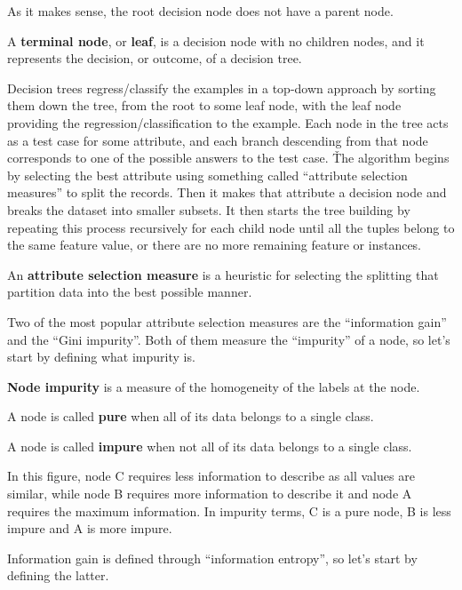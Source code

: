 As it makes sense, the root decision node does not have a parent node.

A \textbf{terminal node}, or \textbf{leaf}, is a decision node with no children nodes, and it represents the decision,
or outcome, of a decision tree.
\ed


Decision trees regress/classify the examples in a top-down approach by sorting them down the tree, from the root to
some leaf node, with the leaf node providing the regression/classification to the example. Each node in the tree
acts as a test case for some attribute, and each branch descending from that node corresponds to one of the possible
answers to the test case. \v

The algorithm begins by selecting the best attribute using something called ``attribute selection measures'' to
split the records. Then it makes that attribute a decision node and breaks the dataset into smaller subsets. It then
starts the tree building by repeating this process recursively for each child node until all the tuples belong to
the same feature value, or there are no more remaining feature or instances.

An \textbf{attribute selection measure} is a heuristic for selecting the splitting that partition data into the best
possible manner.
\ed

Two of the most popular attribute selection measures are the ``information gain'' and the ``Gini impurity''. Both of
them measure the ``impurity'' of a node, so let's start by defining what impurity is.

\textbf{Node impurity} is a measure of the homogeneity of the labels at the node.
\ed

A node is called \textbf{pure} when all of its data belongs to a single class.
\ed

A node is called \textbf{impure} when not all of its data belongs to a single class.
\ed

\be
In this figure, node C requires less information to describe as all values are similar, while node B requires more
information to describe it and node A requires the maximum information. In impurity terms, C is a pure node, B is less
impure and A is more impure.

\ee

Information gain is defined through ``information entropy'', so let's start by defining the latter.

